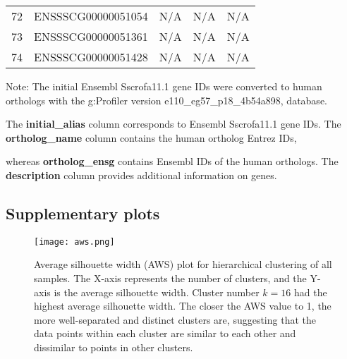 \documentclass[
	a4paper, %
	10pt, %
	unnumberedsections, %
	twoside, %
]{LTJournalArticle}
\begin{document}
\begin{table*}[!ht]
\begin{threeparttable}
{\begin{tabular}{lllll}
	\multicolumn{1}{l|}{72} & ENSSSCG00000051054 & N/A & N/A & N/A \\
	\multicolumn{1}{l|}{73} & ENSSSCG00000051361 & N/A & N/A & N/A \\
	\multicolumn{1}{l|}{74} & ENSSSCG00000051428 & N/A & N/A & N/A \\ \hline
\end{tabular}%
}
\begin{tablenotes}
	\scriptsize
	\item
	\item Note: The initial Ensembl Sscrofa11.1 gene IDs were converted to human orthologs with the g:Profiler version e110\_eg57\_p18\_4b54a898, database. 
	\item The \textbf{initial\_alias} column corresponds to Ensembl Sscrofa11.1 gene IDs. The \textbf{ortholog\_name} column contains the human ortholog Entrez IDs, 
	\item whereas \textbf{ortholog\_ensg} contains Ensembl IDs of the human orthologs. The \textbf{description} column provides additional information on genes.
\end{tablenotes}
	\end{threeparttable}
\end{table*}

\clearpage
\subsection{\normalsize Supplementary plots}\label{splots}
\begin{figure*}[ht] %
    \centering
    \texttt{[image: aws.png]} %
    \caption{Average silhouette width (AWS) plot for hierarchical clustering 
	of all samples. The X-axis represents the number of clusters, and the Y-axis 
	is the average silhouette width. Cluster number $k = 16$ had the highest 
	average silhouette width. The closer the AWS value to 1, the more 
	well-separated and distinct clusters are, suggesting that the data 
	points within each cluster are similar to each other and dissimilar 
	to points in other clusters.}
	\label{fig:aws}
\end{figure*}
\end{document}
